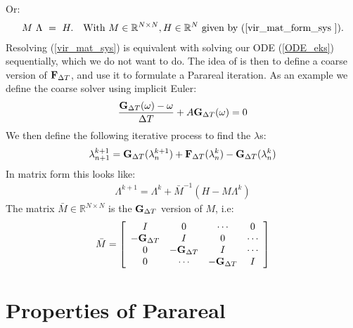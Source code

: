 Or:
\begin{align}
M \ \Lambda \ = \ H.\quad \textrm{With $M\in\mathbb{R}^{N\times N},H\in\mathbb{R}^N$ given by (\ref{vir_mat_form_sys }).} \label{vir_mat_sys}
\end{align}
Resolving (\ref{vir_mat_sys}) is equivalent with solving our ODE (\ref{ODE_eks}) sequentially, which we do not want to do. The idea of \cite{maday2002parareal} is then to define a coarse version of $\bold{F}_{\Delta T}$, and use it to formulate a Parareal iteration. As an example we define the coarse solver using implicit Euler:
 \begin{align}
\frac{\bold{G}_{\Delta T}(\omega) -\omega }{\Delta T } + A \bold{G}_{\Delta T}(\omega) = 0
\end{align}  
We then define the following iterative process to find the $\lambda$s:
\begin{align}
\lambda_{n+1}^{k+1} = \bold{G}_{\Delta T}(\lambda_{n}^{k+1}) + \bold{F}_{\Delta T}(\lambda_{n}^{k})-\bold{G}_{\Delta T}(\lambda_{n}^{k})
\end{align} 
In matrix form this looks like:
\begin{align}
\Lambda^{k+1} = \Lambda^k + \bar{M}^{-1}(H-M\Lambda^k) \label{matrix_iter1}
\end{align}
The matrix $\bar{M}\in\mathbb{R}^{N\times N}$ is the $\bold{G}_{\Delta T}$ version of $M$, i.e:
\begin{align}
\bar{M} = \left[ \begin{array}{cccc}
   I & 0 & \cdots & 0 \\  
   -\bold{G}_{\Delta T} & I & 0 & \cdots \\ 
   0 &-\bold{G}_{\Delta T} & I  & \cdots \\
   0 &\cdots &-\bold{G}_{\Delta T} & I   \\
   \end{array}  \right]
\end{align}
\section{Properties of Parareal}
